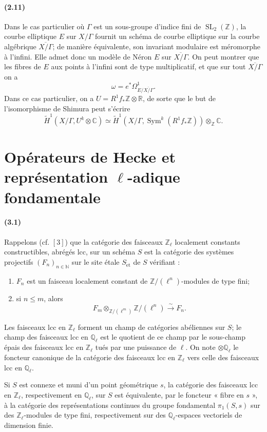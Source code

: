 \documentclass[10pt]{article}
\newcommand{\C}{\mathbb C}
\newcommand{\Q}{\mathbb Q}
\newcommand{\R}{\mathbb R}
\newcommand{\Z}{\mathbb Z}
\newcommand{\SL}{\operatorname{SL}}
\newcommand{\Sym}{\operatorname{Sym}}
\newcommand{\et}{\mathrm{\acute et}}
\begin{document}
\paragraph{(2.11)}
Dans le cas particulier où $\Gamma$ est un sous-groupe d'indice fini de $\SL_2(\Z)$, la
courbe elliptique $E$ sur $X/\Gamma$ fournit un schéma de courbe elliptique sur la courbe
algébrique $\overline{X/\Gamma}$; de manière équivalente, son invariant modulaire est
méromorphe à l'infini. Elle admet donc un modèle de Néron $E$ sur $\overline{X/\Gamma}$.
On peut montrer que les fibres de $E$ aux points à l'infini sont de type multiplicatif, et que
sur tout $\overline{X/\Gamma}$ on a
\[
\omega=e^*\Omega^1_{E/\overline{X/\Gamma}}.
\]
Dans ce cas particulier, on a $U=R^1f_*\Z\otimes\R$, de sorte que le but de l'isomorphisme
de Shimura peut s'écrire
\[
\widetilde H^1(X/\Gamma,U^k\otimes\C)
\simeq
\widetilde H^1(X/\Gamma,\Sym^k(R^1f_*\Z))\otimes_\Z\C .
\]

\section{Opérateurs de Hecke et représentation $\ell$-adique fondamentale}

\paragraph{(3.1)}
Rappelons (cf. \([3]\)) que la catégorie des faisceaux $\Z_\ell$ localement constants
constructibles, abrégés lcc, sur un schéma $S$ est la catégorie des systèmes projectifs
$(F_n)_{n\in\mathbb N}$ sur le site étale $S_{\et}$ de $S$ vérifiant :
\begin{enumerate}[label=(\roman*)]
\item $F_n$ est un faisceau localement constant de $\Z/(\ell^n)$-modules de type fini;
\item si $n\le m$, alors
\[
F_m\otimes_{\Z/(\ell^m)}\Z/(\ell^n)\xrightarrow{\sim}F_n.
\]
\end{enumerate}
Les faisceaux lcc en $\Z_\ell$ forment un champ de catégories abéliennes sur $S$; le
champ des faisceaux lcc en $\Q_\ell$ est le quotient de ce champ par le sous-champ épais
des faisceaux lcc en $\Z_\ell$ tués par une puissance de $\ell$. On note $\otimes\Q_\ell$
le foncteur canonique de la catégorie des faisceaux lcc en $\Z_\ell$ vers celle des faisceaux
lcc en $\Q_\ell$.

Si $S$ est connexe et muni d'un point géométrique $s$, la catégorie des faisceaux lcc en
$\Z_\ell$, respectivement en $\Q_\ell$, sur $S$ est équivalente, par le foncteur « fibre en
$s$ », à la catégorie des représentations continues du groupe fondamental $\pi_1(S,s)$ sur
des $\Z_\ell$-modules de type fini, respectivement sur des $\Q_\ell$-espaces vectoriels de
dimension finie.
\end{document}
